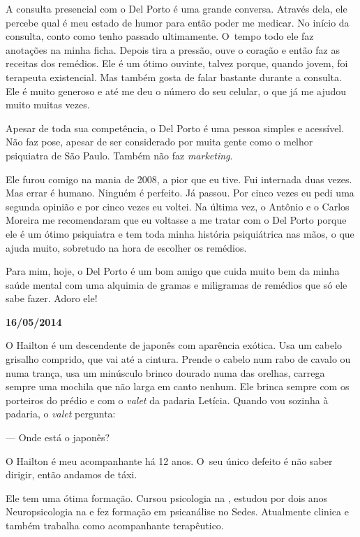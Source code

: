A consulta presencial com o Del Porto é uma grande conversa. Através
dela, ele percebe qual é meu estado de humor para então poder me
medicar. No início da consulta, conto como tenho passado ultimamente. O~tempo todo ele faz anotações na minha ficha. Depois tira a pressão, ouve
o coração e então faz as receitas dos remédios. Ele é um ótimo ouvinte,
talvez porque, quando jovem, foi terapeuta existencial. Mas também gosta
de falar bastante durante a consulta. Ele é muito generoso e até me deu
o número do seu celular, o que já me ajudou muito muitas vezes.

Apesar de toda sua competência, o Del Porto é uma pessoa simples e
acessível. Não faz pose, apesar de ser considerado por muita gente como
o melhor psiquiatra de São Paulo. Também não faz \emph{marketing}.

Ele furou comigo na mania de 2008, a pior que eu tive. Fui internada
duas vezes. Mas errar é humano. Ninguém é perfeito. Já passou. Por cinco
vezes eu pedi uma segunda opinião e por cinco vezes eu voltei. Na última
vez, o Antônio e o Carlos Moreira me recomendaram que eu voltasse a me
tratar com o Del Porto porque ele é um ótimo psiquiatra e tem toda minha
história psiquiátrica nas mãos, o que ajuda muito, sobretudo na hora de
escolher os remédios.

Para mim, hoje, o Del Porto é um bom amigo que cuida muito bem da minha
saúde mental com uma alquimia de gramas e miligramas de remédios que só
ele sabe fazer. Adoro ele!

\begin{center}\asterisc{}\textbf{}\end{center}

\begin{flushright}\textbf{16/05/2014}\end{flushright}


O Hailton é um descendente de japonês com aparência exótica. Usa um
cabelo grisalho comprido, que vai até a cintura. Prende o cabelo num
rabo de cavalo ou numa trança, usa um minúsculo brinco dourado numa das
orelhas, carrega sempre uma mochila que não larga em canto nenhum. Ele
brinca sempre com os porteiros do prédio e com o \emph{valet} da padaria
Letícia. Quando vou sozinha à padaria, o \emph{valet} pergunta:

--- Onde está o japonês?

O Hailton é meu acompanhante há 12 anos. O~seu único defeito é não saber
dirigir, então andamos de táxi.

Ele tem uma ótima formação. Cursou psicologia na , estudou por dois
anos Neuropsicologia na  e fez formação em psicanálise no Sedes.
Atualmente clinica e também trabalha como acompanhante terapêutico.

